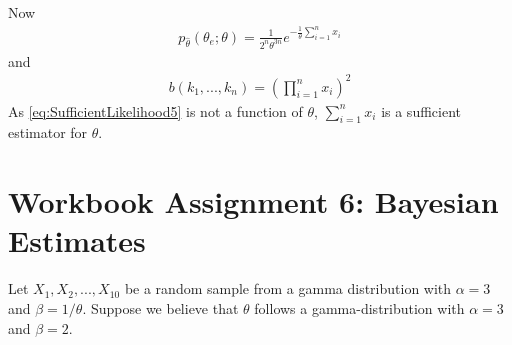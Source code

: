 Now
\begin{equation}
\begin{split}
p_{\hat{\theta}}(\theta_e;\theta) = \frac{1}{2^n\theta^{3n}} e^{-\frac{1}{\theta}\sum_{i=1}^nx_i}
\end{split}
\label{eq:SufficientLikelihood4}
\end{equation}
and
\begin{equation}
\begin{split}
b(k_1,...,k_n) = \left(\prod_{i=1}^n x_i\right)^2
\end{split}
\label{eq:SufficientLikelihood5}
\end{equation}
As \eqref{eq:SufficientLikelihood5} is not a function of $\theta$, $\sum_{i=1}^nx_i$ is a sufficient estimator for $\theta$.






\chapter{Workbook Assignment 6: Bayesian Estimates}	
Let $X_1, X_2, ... , X_{10}$ be a random sample from a gamma distribution with $\alpha =3$ and $\beta =1/\theta$. Suppose we believe that $\theta$ follows a gamma-distribution with $\alpha =3$ and $\beta = 2$.

